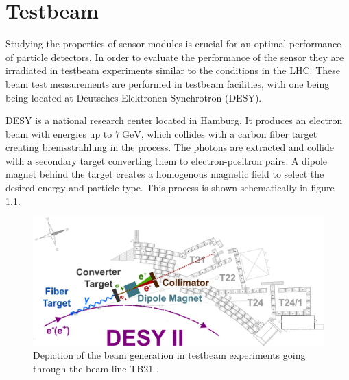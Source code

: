 \chapter{Testbeam}
Studying the properties of sensor modules is crucial for an optimal performance of particle detectors.
In order to evaluate the performance of the sensor they are irradiated in testbeam experiments similar to the conditions in the LHC.
These beam test measurements are performed in testbeam facilities, with one being being located at Deutsches Elektronen Synchrotron (DESY).

DESY is a national research center located in Hamburg.
It produces an electron beam with energies up to
$\SI{7}{\GeV}$, which collides with a carbon fiber target creating bremsstrahlung in the process. The photons are extracted and collide with a secondary target
converting them to electron-positron pairs. A dipole magnet behind the target creates a homogenous magnetic field to select the desired energy and particle type. This process
is shown schematically in figure \ref{fig:testbeam}.

\begin{figure}
  \centering
  \includegraphics[height=0.4\textwidth]{images/desy_modified.jpg}
  \caption{Depiction of the beam generation in testbeam experiments going through the beam line TB21 \cite{testbeam}.}
  \label{fig:testbeam}
\end{figure}

